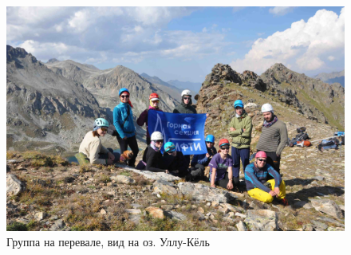 \begin{figure}[h!]
	\centering
	\includegraphics[width=0.7\linewidth]{../pics/DSC_0986}
	\caption{Группа на перевале, вид на оз. Уллу-Кёль}
	\label{fig:DSC_0986}
\end{figure}

\clearpage